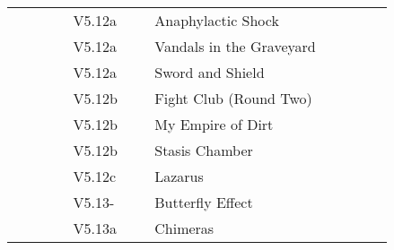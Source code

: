 \begin{flushleft}
\begin{center}
\begin{supertabular}{p{0.13\linewidth}p{0.18\linewidth}p{0.45\linewidth}p{0.08\linewidth}}
&V5.12a&Anaphylactic Shock & \pageref{rt:Anaphylactic Shock} \\
&V5.12a&Vandals in the Graveyard & \pageref{rt:Vandals in the Graveyard} \\
&V5.12a&Sword and Shield & \pageref{rt:Sword and Shield} \\
&V5.12b&Fight Club (Round Two) & \pageref{rt:Fight Club (Round Two)} \\
&V5.12b&My Empire of Dirt & \pageref{rt:My Empire of Dirt} \\
&V5.12b&Stasis Chamber & \pageref{rt:Stasis Chamber} \\
&V5.12c&Lazarus & \pageref{vr:Lazarus} \\
&V5.13-&Butterfly Effect & \pageref{rt:Butterfly Effect} \\
&V5.13a&Chimeras & \pageref{rt:Chimeras} \\
\end{supertabular}
\end{center}
\end{flushleft}
\onecolumn
\clearpage